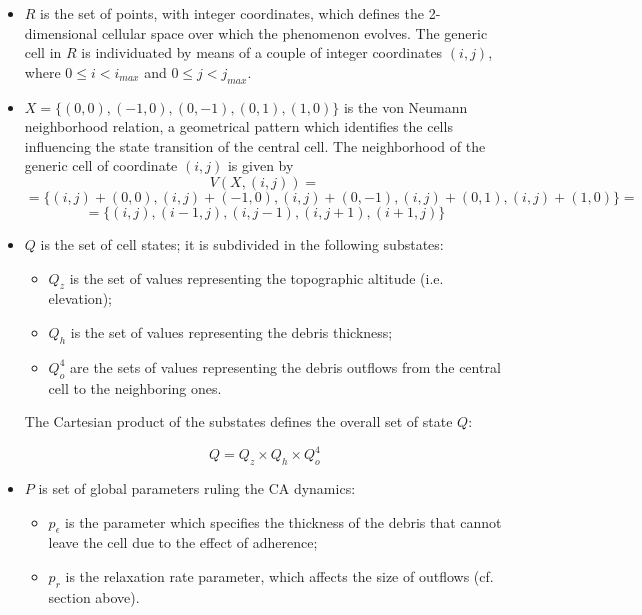 \begin{itemize}

\item $R$ is the set of points, with integer coordinates, which
  defines the 2-dimensional cellular space over which the phenomenon
  evolves. The generic cell in $R$ is individuated by means of a
  couple of integer coordinates $(i, j)$, where $0 \leq i < i_{max}$
  and $0 \leq j < j_{max}$.

\item $X = \{(0,0), (-1, 0), (0, -1), (0, 1), (1, 0)\}$ is the von
  Neumann neighborhood relation, a geometrical pattern which
  identifies the cells influencing the state transition of the central
  cell. The neighborhood of the generic cell of coordinate $(i, j)$ is
  given by
$$V(X, (i, j)) =$$
$$= \{(i, j)+(0,0), (i, j)+(-1, 0), (i, j)+(0, -1),
(i, j)+(0, 1), (i, j)+(1, 0)\} =$$
$$= \{(i, j), (i-1, j), (i, j-1), (i, j+1), (i+1, j)\}$$

\item $Q$ is the set of cell states; it is subdivided in the following
  substates:

\begin{itemize}
    \item   $Q_z$ is the set of values representing the topographic altitude (i.e. elevation);
    \item   $Q_h$ is the set of values representing the debris thickness;
    \item   $Q_o^4$ are the sets of values representing the debris outflows from the central cell to the neighboring ones.
\end{itemize}

The Cartesian product of the substates defines the overall set of
state $Q$:

$$Q = Q_z \times Q_h \times Q_o^4$$

\item   $P$ is set of global parameters ruling the CA dynamics:

\begin{itemize}
    \item   $p_\epsilon$ is the parameter which specifies the thickness of the debris that cannot leave the cell due to the effect of adherence;
    \item   $p_r$ is the relaxation rate parameter, which affects the size of outflows (cf. section above).
\end{itemize}


\end{itemize}
